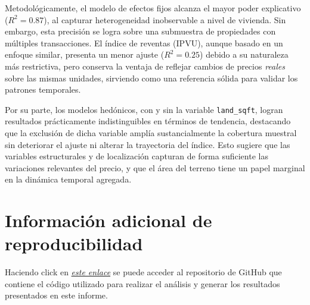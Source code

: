 \documentclass[conference]{IEEEtran}
\begin{document}
Metodológicamente, el modelo de efectos fijos alcanza el mayor poder explicativo ($R^2 = 0.87$), al capturar heterogeneidad inobservable a nivel de vivienda. Sin embargo, esta precisión se logra sobre una submuestra de propiedades con múltiples transacciones. El índice de reventas (IPVU), aunque basado en un enfoque similar, presenta un menor ajuste ($R^2 = 0.25$) debido a su naturaleza más restrictiva, pero conserva la ventaja de reflejar cambios de precios \emph{reales} sobre las mismas unidades, sirviendo como una referencia sólida para validar los patrones temporales.

Por su parte, los modelos hedónicos, con y sin la variable \texttt{land\_sqft}, logran resultados prácticamente indistinguibles en términos de tendencia, destacando que la exclusión de dicha variable amplía sustancialmente la cobertura muestral sin deteriorar el ajuste ni alterar la trayectoria del índice. Esto sugiere que las variables estructurales y de localización capturan de forma suficiente las variaciones relevantes del precio, y que el área del terreno tiene un papel marginal en la dinámica temporal agregada.

\section{Información adicional de reproducibilidad}

Haciendo click en \href{https://github.com/larubiano0/HW1-Urban-Economics-part1}{\textit{este enlace}} se puede acceder al repositorio de GitHub que contiene el código utilizado para realizar el análisis y generar los resultados presentados en este informe.
\end{document}
